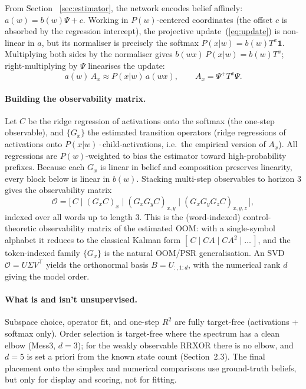 \documentclass[11pt]{article}
\begin{document}
From Section ~\ref{sec:estimator}, the network encodes belief affinely: $a(w) = b(w)\Psi + c$.
Working in $P(w)$-centered coordinates (the offset $c$ is absorbed by the
regression intercept), the projective update~(\ref{eq:update}) is non-linear in $a$, but its
normaliser is precisely the softmax $P(x|w) = b(w)T^x\mathbf{1}$. Multiplying both sides by the
normaliser gives $b(wx)\,P(x|w) = b(w)T^x$; right-multiplying by $\Psi$
linearises the update:
\begin{equation}
a(w)\,A_x \approx P(x|w)\,a(wx), \qquad A_x=\Psi^{+}T^x\Psi .
\end{equation}

\paragraph{Building the observability matrix.}
Let $C$ be the ridge regression of activations onto the softmax (the one-step observable),
and $\{G_x\}$ the estimated transition operators (ridge regressions of activations onto
$P(x|w)\cdot$child-activations, i.e.\ the empirical version of $A_x$). All regressions are
$P(w)$-weighted to bias the estimator toward high-probability prefixes. Because each $G_x$
is linear in belief and composition preserves linearity, every block below is linear in
$b(w)$. Stacking multi-step observables to horizon $3$ gives the observability matrix
\begin{equation}
\mathcal{O}=\big[\,C \;\big|\; (G_x C)_{x} \;\big|\; (G_x G_y C)_{x,y}
\;\big|\; (G_x G_y G_z C)_{x,y,z}\,\big],
\end{equation}
indexed over all words up to length $3$. This is the (word-indexed) control-theoretic
observability matrix of the estimated OOM: with a single-symbol alphabet it reduces to the
classical Kalman form $[\,C \mid CA \mid CA^2 \mid \dots\,]$, and the token-indexed family
$\{G_x\}$ is the natural OOM/PSR generalisation. An SVD $\mathcal{O}=U\Sigma V^\top$ yields
the orthonormal basis $B=U_{:,1:d}$, with the numerical rank $d$ giving the model order.

\paragraph{What is and isn't unsupervised.}
Subspace choice, operator fit, and one-step $R^2$ are fully target-free (activations +
softmax only). Order selection is target-free where the spectrum has a clean elbow
(Mess3, $d=3$); for the weakly observable RRXOR there is no elbow, and $d=5$ is set a
priori from the known state count (Section~2.3). The final placement onto the simplex and
numerical comparisons use ground-truth beliefs, but only for display and scoring, not for
fitting.
\end{document}
